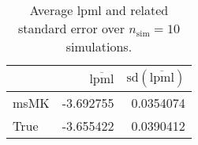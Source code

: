 \begin{table}[H]

\caption{Average lpml and related standard error over $n_{\text{sim}} = 10$ simulations.}
\centering
\begin{tabular}[t]{lrr}
\toprule
  & $\overbar{\text{lpml}}$ & $\text{sd}(\overbar{\text{lpml}})$\\
\midrule
msMK & -3.692755 & 0.0354074\\
True & -3.655422 & 0.0390412\\
\bottomrule
\end{tabular}
\end{table}